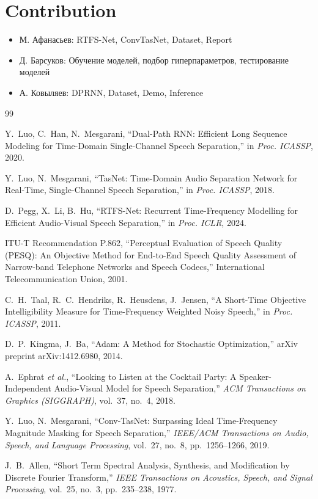 \documentclass[10pt,conference,compsocconf]{IEEEtran}
\begin{document}
\section{Contribution}
\begin{itemize}
    \item М. Афанасьев: RTFS-Net, ConvTasNet, Dataset, Report
    \item Д. Барсуков: Обучение моделей, подбор гиперпараметров, тестирование моделей
    \item А. Ковыляев: DPRNN, Dataset, Demo, Inference
\end{itemize}
\begin{thebibliography}{99}

Y.~Luo, C.~Han, N.~Mesgarani,
``Dual-Path RNN: Efficient Long Sequence Modeling for Time-Domain Single-Channel Speech Separation,''
in \textit{Proc. ICASSP}, 2020.

Y.~Luo, N.~Mesgarani,
``TasNet: Time-Domain Audio Separation Network for Real-Time, Single-Channel Speech Separation,''
in \textit{Proc. ICASSP}, 2018.

D.~Pegg, X.~Li, B.~Hu,
``RTFS-Net: Recurrent Time-Frequency Modelling for Efficient Audio-Visual Speech Separation,''
in \textit{Proc. ICLR}, 2024.

ITU-T Recommendation P.862,
``Perceptual Evaluation of Speech Quality (PESQ): An Objective Method for End-to-End Speech Quality Assessment of Narrow-band Telephone Networks and Speech Codecs,''
International Telecommunication Union, 2001.

C.~H.~Taal, R.~C.~Hendriks, R.~Heusdens, J.~Jensen,
``A Short-Time Objective Intelligibility Measure for Time-Frequency Weighted Noisy Speech,''
in \textit{Proc. ICASSP}, 2011.

D.~P.~Kingma, J.~Ba,
``Adam: A Method for Stochastic Optimization,''
arXiv preprint arXiv:1412.6980, 2014.

A.~Ephrat \textit{et al.},
``Looking to Listen at the Cocktail Party: A Speaker-Independent Audio-Visual Model for Speech Separation,''
\textit{ACM Transactions on Graphics (SIGGRAPH)}, vol.~37, no.~4, 2018.

Y.~Luo, N.~Mesgarani,
``Conv-TasNet: Surpassing Ideal Time-Frequency Magnitude Masking for Speech Separation,''
\textit{IEEE/ACM Transactions on Audio, Speech, and Language Processing}, vol.~27, no.~8, pp.~1256--1266, 2019.

J.~B.~Allen,
``Short Term Spectral Analysis, Synthesis, and Modification by Discrete Fourier Transform,''
\textit{IEEE Transactions on Acoustics, Speech, and Signal Processing}, vol.~25, no.~3, pp.~235--238, 1977.

\end{thebibliography}
\end{document}
